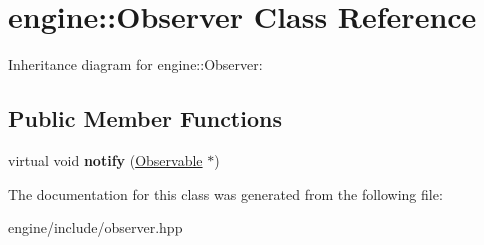 \hypertarget{classengine_1_1_observer}{}\section{engine\+:\+:Observer Class Reference}
\label{classengine_1_1_observer}


Inheritance diagram for engine\+:\+:Observer\+:
\subsection*{Public Member Functions}
\begin{DoxyCompactItemize}
\item 
virtual void {\bfseries notify} (\hyperlink{classengine_1_1_observable}{Observable} $\ast$)\hypertarget{classengine_1_1_observer_ab76a5769987d7f2b3cda09f4a44fa0fd}{}\label{classengine_1_1_observer_ab76a5769987d7f2b3cda09f4a44fa0fd}

\end{DoxyCompactItemize}


The documentation for this class was generated from the following file\+:\begin{DoxyCompactItemize}
\item 
engine/include/observer.\+hpp\end{DoxyCompactItemize}
